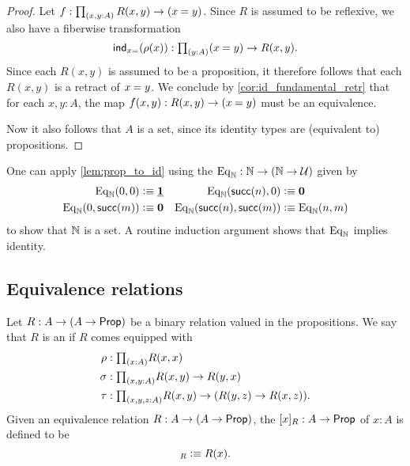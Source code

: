 \begin{proof}
Let $f:\prd{x,y:A}R(x,y)\to(\id{x}{y})$. 
Since $R$ is assumed to be reflexive, we also have a fiberwise transformation
\begin{equation*}
\ind{x{=}}(\rho(x)):\prd{y:A}(\id{x}{y})\to R(x,y).
\end{equation*}
Since each $R(x,y)$ is assumed to be a proposition, it therefore follows that each $R(x,y)$ is a retract of $\id{x}{y}$. We conclude by \autoref{cor:id_fundamental_retr} that for each $x,y:A$, the map $f(x,y):R(x,y)\to(\id{x}{y})$ must be an equivalence.

Now it also follows that $A$ is a set, since its identity types are (equivalent to) propositions.
\end{proof}

\begin{eg}
One can apply \cref{lem:prop_to_id} using the  $\mathrm{Eq}_\mathbb{N}:\mathbb{N}\to (\mathbb{N}\to\mathcal{U})$ given by
\begin{align*}
\mathrm{Eq}_\mathbb{N}(0,0) & \vcentcolon\equiv \underline{\mathbf{1}} & \mathrm{Eq}_\mathbb{N}(\mathsf{succ}(n),0) & \vcentcolon\equiv \mathbf{0} \\
\mathrm{Eq}_\mathbb{N}(0,\mathsf{succ}(m)) & \vcentcolon\equiv \mathbf{0} & \mathrm{Eq}_\mathbb{N}(\mathsf{succ}(n),\mathsf{succ}(m)) & \vcentcolon\equiv \mathrm{Eq}_\mathbb{N}(n,m)
\end{align*}
to show that $\mathbb{N}$ is a set. A routine induction argument shows that $\mathrm{Eq}_\mathbb{N}$ implies identity.
\end{eg}

\subsection{Equivalence relations}

\begin{defn}\label{defn:eq_rel}
Let $R:A\to (A\to\mathsf{Prop})$ be a binary relation valued in the propositions. We say that $R$ is an  if $R$ comes equipped with
\begin{align*}
\rho & : \prd{x:A}R(x,x) \\
\sigma & : \prd{x,y:A} R(x,y)\to R(y,x) \\
\tau & : \prd{x,y,z:A} R(x,y)\to (R(y,z)\to R(x,z)).
\end{align*}
Given an equivalence relation $R:A\to (A\to\mathsf{Prop})$, the  $[x]_R:A\to\mathsf{Prop}$ of $x:A$ is defined to be
\begin{equation*}
[x]_R\defeq R(x).
\end{equation*}
\end{defn}

